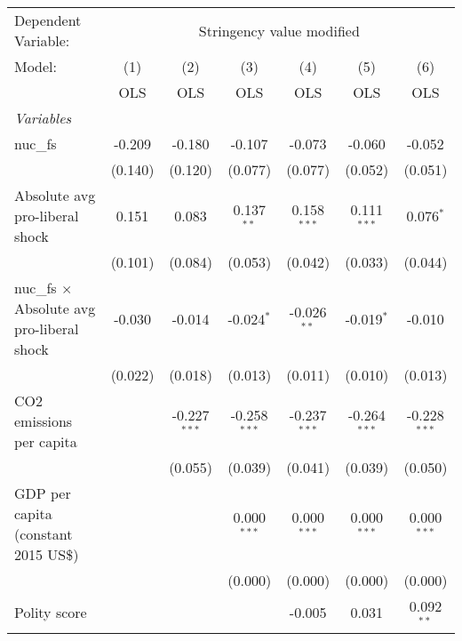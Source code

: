 
\begingroup
\centering
\begin{tabular}{lcccccc}
   \toprule
   Dependent Variable: & \multicolumn{6}{c}{Stringency value modified}\\
   Model:                                            & (1)     & (2)            & (3)            & (4)            & (5)            & (6)\\  
                                                     &  OLS    & OLS            & OLS            & OLS            & OLS            & OLS\\  
   \midrule
   \emph{Variables}\\
   nuc\_fs                                           & -0.209  & -0.180         & -0.107         & -0.073         & -0.060         & -0.052\\   
                                                     & (0.140) & (0.120)        & (0.077)        & (0.077)        & (0.052)        & (0.051)\\   
   Absolute avg pro-liberal shock                    & 0.151   & 0.083          & 0.137$^{**}$   & 0.158$^{***}$  & 0.111$^{***}$  & 0.076$^{*}$\\   
                                                     & (0.101) & (0.084)        & (0.053)        & (0.042)        & (0.033)        & (0.044)\\   
   nuc\_fs $\times$ Absolute avg pro-liberal shock   & -0.030  & -0.014         & -0.024$^{*}$   & -0.026$^{**}$  & -0.019$^{*}$   & -0.010\\   
                                                     & (0.022) & (0.018)        & (0.013)        & (0.011)        & (0.010)        & (0.013)\\   
   CO2 emissions per capita                          &         & -0.227$^{***}$ & -0.258$^{***}$ & -0.237$^{***}$ & -0.264$^{***}$ & -0.228$^{***}$\\   
                                                     &         & (0.055)        & (0.039)        & (0.041)        & (0.039)        & (0.050)\\   
   GDP per capita (constant 2015 US\$)               &         &                & 0.000$^{***}$  & 0.000$^{***}$  & 0.000$^{***}$  & 0.000$^{***}$\\   
                                                     &         &                & (0.000)        & (0.000)        & (0.000)        & (0.000)\\   
   Polity score                                      &         &                &                & -0.005         & 0.031          & 0.092$^{**}$\\   

\end{tabular}
